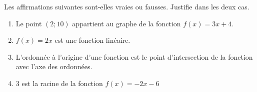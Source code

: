 %
%
    Les affirmations suivantes sont-elles vraies ou fausses. Justifie dans les deux cas.
    \begin{enumerate}[itemsep=1em]
        \item Le point $(2;10)$ appartient au graphe de la fonction $f(x)=3x+4$.
        \item $f(x) = 2x$ est une fonction linéaire.
        \item L'ordonnée à l'origine d'une fonction est le point d'intersection de la fonction avec l'axe des ordonnées.
        \item $3$ est la racine de la fonction $f(x)=-2x-6$
    \end{enumerate}
    \vspace*{1em}
